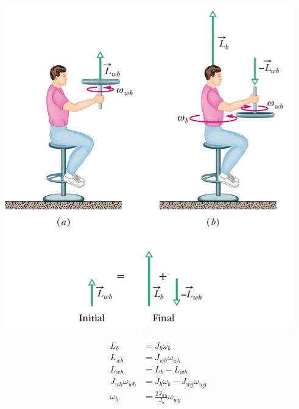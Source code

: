 \begin{minipage}[h!]{0.5\linewidth}
\includegraphics[width=0.8\linewidth]{images/drehimpuls}
\end{minipage}
\hfill
\begin{minipage}[h!]{0.5\linewidth}
	\begin{align*}
		L_b &= J_b \omega_b \\
		L_{wh} &= J_{wh} \omega_{wh} \\
		L_{wh} &= L_b - L_{wh} \\
		J_{wh} \omega_{wh} &= J_b \omega_b - J_{wg} \omega_{wg} \\
		\omega_b &= \frac{2J_{wh}}{J_b} \omega_{wg} \\
	\end{align*}
\end{minipage}